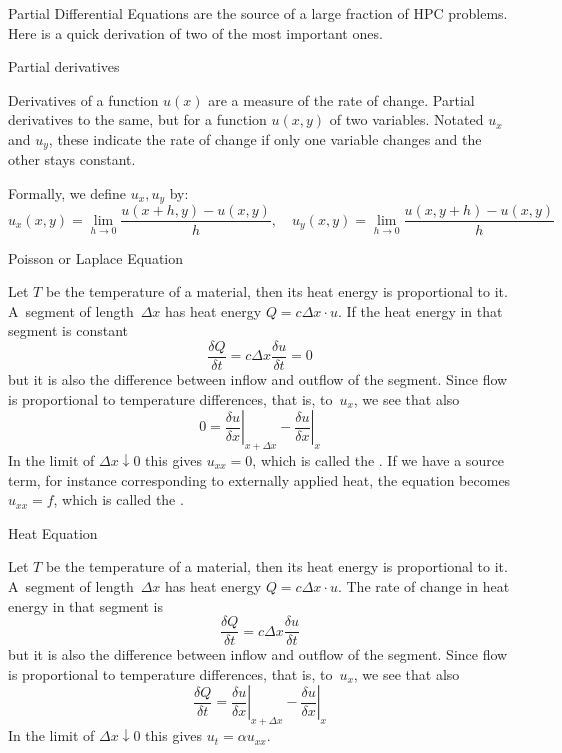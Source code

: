 
Partial Differential Equations
are the source of a large fraction of \ac{HPC} problems. Here is a
quick derivation of two of the most important ones.

 {Partial derivatives}

Derivatives of a function $u(x)$ are a measure of the rate of
change. Partial derivatives to the same, but for a function $u(x,y)$
of two variables. Notated $u_x$ and $u_y$, these  indicate the rate of change if only one variable changes
and the other stays constant.

Formally, we define
$u_x,u_y$ by:
\[ u_x(x,y) = \lim_{h\rightarrow0}\frac{u(x+h,y)-u(x,y)}h,\quad
   u_y(x,y) = \lim_{h\rightarrow0}\frac{u(x,y+h)-u(x,y)}h
\]

 {Poisson or Laplace Equation}

Let $T$ be the temperature of a material, then its heat energy is
proportional to it. A~segment of length~$\Delta x$ has heat energy
$Q=c\Delta x\cdot u$. If the heat energy in that
segment is constant
\[ \frac{\delta Q}{\delta t}=c\Delta x\frac{\delta u}{\delta t}=0 \]
but it is also the difference between inflow and outflow of the
segment. Since flow is proportional to temperature differences, that
is, to~$u_x$, we see that also
\[ 0=
    \left.\frac{\delta u}{\delta x}\right|_{x+\Delta x}-
    \left.\frac{\delta u}{\delta x}\right|_{x}
\]
In the limit of $\Delta x\downarrow0$ this gives $u_{xx}=0$, which is
called the . If we have a source term, for
instance corresponding to externally applied heat, the equation
becomes $u_{xx}=f$, which is called the .

 {Heat Equation}
\label{sec:derive-heat}

Let $T$ be the temperature of a material, then its heat energy is
proportional to it. A~segment of length~$\Delta x$ has heat energy
$Q=c\Delta x\cdot u$. The rate of change in heat energy in that
segment is
\[ \frac{\delta Q}{\delta t}=c\Delta x\frac{\delta u}{\delta t} \]
but it is also the difference between inflow and outflow of the
segment. Since flow is proportional to temperature differences, that
is, to~$u_x$, we see that also
\[ \frac{\delta Q}{\delta t}=
    \left.\frac{\delta u}{\delta x}\right|_{x+\Delta x}-
    \left.\frac{\delta u}{\delta x}\right|_{x}
\]
In the limit of $\Delta x\downarrow0$ this gives $u_t=\alpha u_{xx}$.

